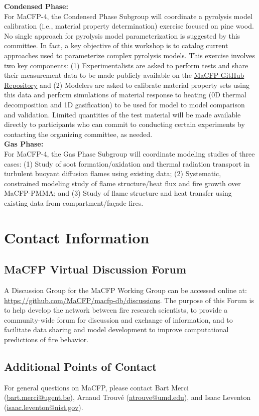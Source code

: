 \documentclass[12pt]{article}
\begin{document}
\textbf{Condensed Phase:}\\
For MaCFP-4, the Condensed Phase Subgroup will coordinate a pyrolysis model calibration (i.e., material property determination) exercise focused on pine wood. No single approach for pyrolysis model parameterization is suggested by this committee. In fact, a key objective of this workshop is to catalog current approaches used to parameterize complex pyrolysis models. This exercise involves two key components: (1) Experimentalists are asked to perform tests and share their measurement data to be made publicly available on the \href{https://github.com/MaCFP/matl-db/Wood**}{MaCFP GitHub Repository} and (2) Modelers are asked to calibrate material property sets using this data and perform simulations of material response to heating (0D thermal decomposition and 1D gasification) to be used for model to model comparison and validation. Limited quantities of the test material will be made available directly to participants who can commit to conducting certain experiments by contacting the organizing committee, as needed. \\

\textbf{Gas Phase:}\\
For MaCFP-4, the Gas Phase Subgroup will coordinate modeling studies of three cases: (1) Study of soot formation/oxidation and thermal radiation transport in turbulent buoyant diffusion flames using existing data; (2) Systematic, constrained modeling study of flame structure/heat flux and fire growth over MaCFP-PMMA; and (3) Study of flame structure and heat transfer using existing data from compartment/façade fires.

\pagebreak
\section{Contact Information}
 \subsection*{MaCFP Virtual Discussion Forum}
A Discussion Group for the MaCFP Working Group can be accessed online at: \url{https://github.com/MaCFP/macfp-db/discussions}. The purpose of this Forum is to help develop the network between fire research scientists, to provide a community-wide forum for discussion and exchange of information, and to facilitate data sharing and model development to improve computational predictions of fire behavior.\\

\subsection*{Additional Points of Contact}
\noindent For general questions on MaCFP, please contact Bart Merci (\href{mailto:bart.merci@ugent.be}{bart.merci@ugent.be}), Arnaud Trouv\'e (\href{mailto:atrouve@umd.edu}{atrouve@umd.edu}), and Isaac Leventon (\href{mailto:isaac.leventon@nist.gov}{isaac.leventon@nist.gov}).\\
\end{document}
